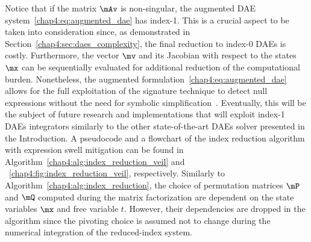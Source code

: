 Notice that if the matrix $\mAv$ is non-singular, the augmented \ac{DAE} system~\eqref{chap4:eq:augmented_dae} has index-1. This is a crucial aspect to be taken into consideration since, as demonstrated in Section~\ref{chap4:sec:daes_complexity}, the final reduction to index-0 \acp{DAE} is costly. Furthermore, the vector $\mv$ and its Jacobian with respect to the states $\mx$ can be sequentially evaluated for additional reduction of the computational burden. Nonetheless, the augmented formulation~\eqref{chap4:eq:augmented_dae} allows for the full exploitation of the signature technique to detect null expressions without the need for symbolic simplification~\cite{monagan1994signature}. Eventually, this will be the subject of future research and implementations that will exploit index-1 \acp{DAE} integrators similarly to the other state-of-the-art \acp{DAE} solver presented in the Introduction. A pseudocode and a flowchart of the index reduction algorithm with expression swell mitigation can be found in Algorithm~\ref{chap4:alg:index_reduction_veil} and \figurename~\ref{chap4:fig:index_reduction_veil}, respectively. Similarly to Algorithm~\ref{chap4:alg:index_reduction}, the choice of permutation matrices $\mP$ and $\mQ$ computed during the matrix factorization are dependent on the state variables $\mx$ and free variable $t$. However, their dependencies are dropped in the algorithm since the pivoting choice is assumed not to change during the numerical integration of the reduced-index system.

